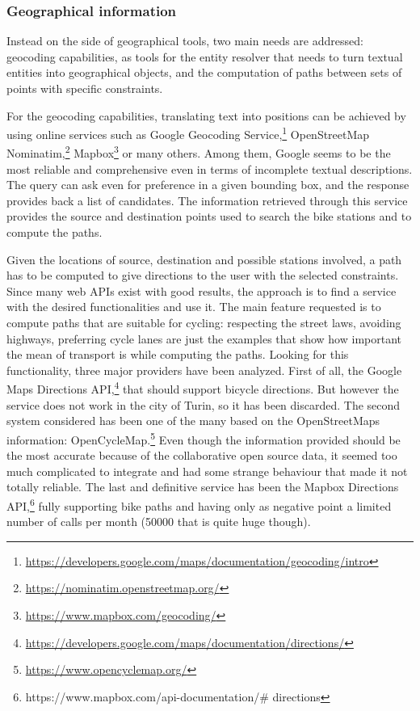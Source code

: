 \subsubsection{Geographical information}
Instead on the side of geographical tools, two main needs are addressed: geocoding capabilities, as tools for the entity resolver that needs to turn textual entities into geographical objects, and the computation of paths between sets of points with specific constraints.

For the geocoding capabilities, translating text into positions can be achieved by using online services such as Google Geocoding Service,\footnote{\url{https://developers.google.com/maps/documentation/geocoding/intro}} OpenStreetMap Nominatim,\footnote{\url{https://nominatim.openstreetmap.org/}} Mapbox\footnote{\url{https://www.mapbox.com/geocoding/}} or many others. Among them, Google seems to be the most reliable and comprehensive even in terms of incomplete textual descriptions. The query can ask even for preference in a given bounding box, and the response provides back a list of candidates. The information retrieved through this service provides the source and destination points used to search the bike stations and to compute the paths.

Given the locations of source, destination and possible stations involved, a path has to be computed to give directions to the user with the selected constraints. Since many web APIs exist with good results, the approach is to find a service with the desired functionalities and use it. The main feature requested is to compute paths that are suitable for cycling: respecting the street laws, avoiding highways, preferring cycle lanes are just the examples that show how important the mean of transport is while computing the paths. Looking for this functionality, three major providers have been analyzed. First of all, the Google Maps Directions API,\footnote{\url{https://developers.google.com/maps/documentation/directions/}} that should support bicycle directions. But however the service does not work in the city of Turin, so it has been discarded. The second system considered has been one of the many based on the OpenStreetMaps information: OpenCycleMap.\footnote{\url{https://www.opencyclemap.org/}} Even though the information provided should be the most accurate because of the collaborative open source data, it seemed too much complicated to integrate and had some strange behaviour that made it not totally reliable. The last and definitive service has been the Mapbox Directions API,\footnote{ https://www.mapbox.com/api-documentation/$\#$ directions  } fully supporting bike paths and having only as negative point a limited number of calls per month (50000 that is quite huge though).

